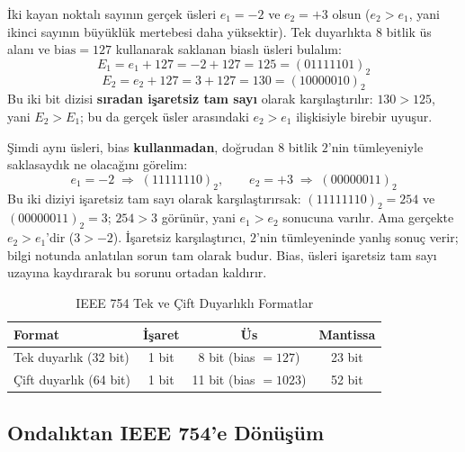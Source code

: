 \begin{ornek}[Biaslı Üsün Karşılaştırmadaki Avantajı: $e=-2$ ile $e=+3$]
İki kayan noktalı sayının gerçek üsleri $e_1=-2$ ve $e_2=+3$ olsun ($e_2>e_1$, yani ikinci
sayının büyüklük mertebesi daha yüksektir). Tek duyarlıkta $8$ bitlik üs alanı ve
$\text{bias}=127$ kullanarak saklanan biaslı üsleri bulalım:
\[
E_1 = e_1+127 = -2+127 = 125 = (01111101)_2
\]
\[
E_2 = e_2+127 = 3+127 = 130 = (10000010)_2
\]
Bu iki bit dizisi \textbf{sıradan işaretsiz tam sayı} olarak karşılaştırılır: $130>125$,
yani $E_2>E_1$; bu da gerçek üsler arasındaki $e_2>e_1$ ilişkisiyle birebir uyuşur.
\checkmark

Şimdi aynı üsleri, bias \textbf{kullanmadan}, doğrudan $8$ bitlik $2$'nin tümleyeniyle
saklasaydık ne olacağını görelim:
\[
e_1=-2 \;\Rightarrow\; (11111110)_2, \qquad e_2=+3 \;\Rightarrow\; (00000011)_2
\]
Bu iki diziyi işaretsiz tam sayı olarak karşılaştırırsak: $(11111110)_2=254$ ve
$(00000011)_2=3$; $254>3$ görünür, yani $e_1>e_2$ sonucuna varılır. Ama gerçekte
$e_2>e_1$'dir ($3>-2$). İşaretsiz karşılaştırıcı, $2$'nin tümleyeninde yanlış sonuç
verir; bilgi notunda anlatılan sorun tam olarak budur. Bias, üsleri işaretsiz tam sayı
uzayına kaydırarak bu sorunu ortadan kaldırır.
\end{ornek}

\begin{table}[H]
\centering
\begin{tabular}{lccc}
\toprule
Format & İşaret & Üs & Mantissa \\
\midrule
Tek duyarlık (32 bit) & 1 bit & 8 bit (bias $=127$) & 23 bit \\
Çift duyarlık (64 bit) & 1 bit & 11 bit (bias $=1023$) & 52 bit \\
\bottomrule
\end{tabular}
\caption{IEEE 754 Tek ve Çift Duyarlıklı Formatlar}
\label{tab:ieee754-format}
\end{table}

\subsection{Ondalıktan IEEE 754'e Dönüşüm}
\label{sec:ondalik-ieee754}


